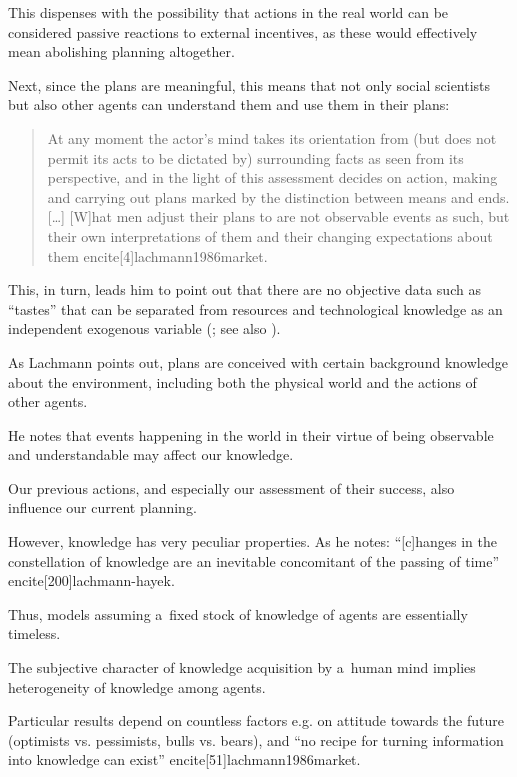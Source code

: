 {This dispenses with the possibility that actions in the real world can be considered passive reactions to external incentives, as these would effectively mean abolishing planning altogether.

Next, since the plans are meaningful, this means that not only social scientists but also other agents can understand them and use them in their plans:

\begin{quote}

At any moment the actor's mind takes its orientation from (but does not permit its acts to be dictated by) surrounding facts as seen from its perspective, and in the light of this assessment decides on action, making and carrying out plans marked by the distinction between means and ends. [\ldots] [W]hat men adjust their plans to are not observable events as such, but their own interpretations of them and their changing expectations about them encite[4]{lachmann1986market}.

\end{quote}

This, in turn, leads him to point out that there are no objective data such as ``tastes'' that can be separated from resources and technological knowledge as an independent exogenous variable (\cite[24]{lachmann1986market}; see also \cite[35]{lachmann-crisis}).



As Lachmann points out, plans are conceived with certain background knowledge about the environment, including both the physical world and the actions of other agents.

He notes that events happening in the world in their virtue of being observable and understandable may affect our knowledge.

Our previous actions, and especially our assessment of their success, also influence our current planning.

However, knowledge has very peculiar properties. As he notes: ``[c]hanges in the constellation of knowledge are an inevitable concomitant of the passing of time'' encite[200]{lachmann-hayek}.

Thus, models assuming a~fixed stock of knowledge of agents are essentially timeless.



The subjective character of knowledge acquisition by a~human mind implies heterogeneity of knowledge among agents.

Particular results depend on countless factors e.g. on attitude towards the future (optimists vs. pessimists, bulls vs. bears), and ``no recipe for turning information into knowledge can exist'' encite[51]{lachmann1986market}.

}
